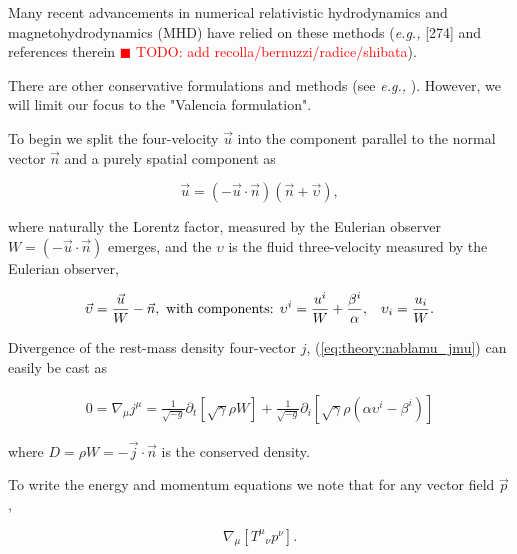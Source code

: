 \documentclass[11pt,a4paper,headinclude=true,DIV=14,BCOR=8mm,chapterprefix,listof=totoc,twoside,openright,abstracton]{scrbook}
\newcommand{\todo}[1]{\textcolor{red}{$\blacksquare$ TODO: #1}}
\begin{document}
Many recent advancements in numerical relativistic hydrodynamics and magnetohydrodynamics (MHD) have relied on these methods (\textit{e.g.,} \cite{Giacomazzo:2010bx} [274]\cite{Rezzolla:2011da} and references therein \todo{add recolla/bernuzzi/radice/shibata}).

There are other conservative formulations and methods (see \textit{e.g.,} \cite{Papadopoulos:1999kt}). However, we will limit our focus to the "Valencia formulation". 

To begin we split the four-velocity $\vec{u}$ into the component parallel to the normal vector $\vec{n}$ and a purely spatial component as

\begin{equation}
\vec{u} = (-\vec{u} \cdot \vec{n})(\vec{n} + \vec{\upsilon}),
\end{equation}

where naturally the Lorentz factor, measured by the Eulerian observer $W = (-\vec{u}\cdot\vec{n})$ emerges, and the $\upsilon$ is the fluid three-velocity measured by the Eulerian observer, 

\begin{equation}
\vec{\upsilon} = \frac{\vec{u}}{W} -\vec{n}, \text{ with components: } \upsilon^i = \frac{u^i}{W}+ \frac{\beta^i}{\alpha}, \hspace{3mm} \upsilon_i= \frac{u_{i}}{W}.
\end{equation}



Divergence of the rest-mass density four-vector $j$, (\ref{eq:theory:nablamu_jmu}) can easily be cast as 

\begin{eqnarray}
0 = \nabla_{\mu}j^{\mu} = \frac{1}{\sqrt{-g}}\partial_{t}[\sqrt{\gamma}\rho W] + \frac{1}{\sqrt{-g}}\partial_{i}[\sqrt{\gamma}\rho(\alpha \upsilon^{i} - \beta^{i})]
\end{eqnarray}

where $D=\rho W = -\vec{j}\cdot \vec{n}$ is the conserved density.

To write the energy and momentum equations we note that for any vector field $\vec{p} $ \cite{Rezzolla:2013}, 

\begin{equation}
\nabla_{\mu}[{T^{\mu}}_{\nu}p^{\nu}].
\end{equation}
\end{document}
